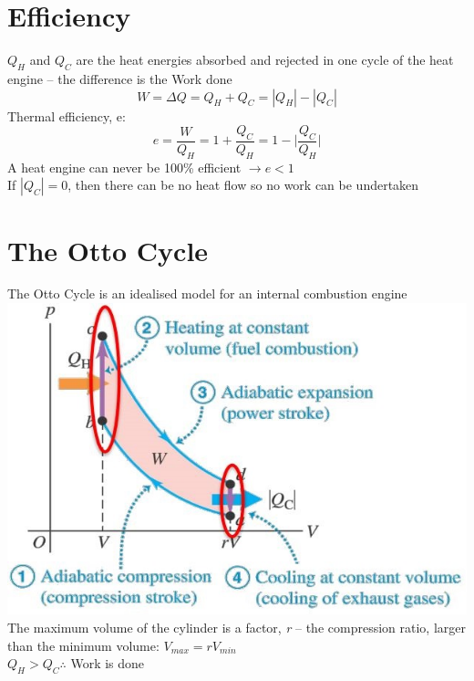 \documentclass[a4paper, 11pt, fleqn, normalem]{report}
\begin{document}
\section{Efficiency}
$Q_{H}$ and $Q_{C}$ are the heat energies absorbed and rejected in one cycle of the heat engine -- the difference is the Work done
\begin{equation*}
	W = {\Delta}Q = Q_{H} + Q_{C} = |Q_{H}| - |Q_{C}|
\end{equation*}
Thermal efficiency, e:
\begin{equation*}
	e = \frac{W}{Q_{H}} = 1 + \frac{Q_{C}}{Q_{H}} = 1 - \bigg|\frac{Q_{C}}{Q_{H}}\bigg|
\end{equation*}
A heat engine can never be 100\% efficient $\rightarrow e < 1$ \\
If $|Q_{C}| = 0$, then there can be no heat flow so no work can be undertaken

\section{The Otto Cycle}
The Otto Cycle is an idealised model for an internal combustion engine \\
\includegraphics[scale=0.8]{Otto.jpg} \\
The maximum volume of the cylinder is a factor, \emph{r} -- the compression ratio, larger than the minimum volume: $V_{max} = rV_{min}$ \\
$Q_{H} > Q_{C} \therefore$ Work is done
\end{document}
